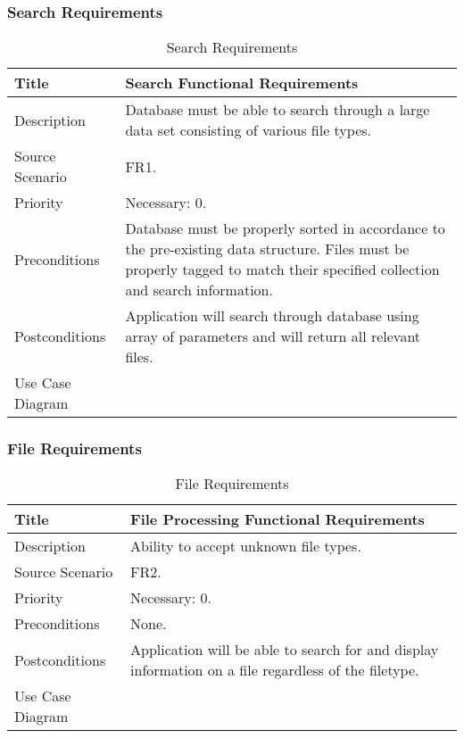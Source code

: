 \subsubsection{Search Requirements}
  \begin{table}[h!]
    \caption{Search Requirements}
    \label{system-requirements/functional-requirements/search}
    \begin{tabularx}{\textwidth}{|l|X|}
      \hline
      Title            & Search Functional Requirements \\ \hline
      Description      & Database must be able to search through a large data
                         set consisting of various file types. \\ \hline
      Source Scenario  & FR1. \\ \hline
      Priority         & Necessary: 0. \\ \hline
      Preconditions    & Database must be properly sorted in accordance to the
                         pre-existing data structure. Files must be properly
                         tagged to match their specified collection and search
                         information. \\ \hline
      Postconditions   & Application will search through database using array of
                         parameters and will return all relevant files. \\
                         \hline
      Use Case Diagram & \\ \hline
    \end{tabularx}
  \end{table}

\subsubsection{File Requirements}
  \begin{table}[h!]
    \caption{File Requirements}
    \label{system-requirements/functional-requirements/file}
    \begin{tabularx}{\textwidth}{|l|X|}
      \hline
      Title            & File Processing Functional Requirements \\ \hline
      Description      & Ability to accept unknown file types. \\ \hline
      Source Scenario  & FR2. \\ \hline
      Priority         & Necessary: 0. \\ \hline
      Preconditions    & None. \\ \hline
      Postconditions   & Application will be able to search for and display
                         information on a file regardless of the filetype. \\
                         \hline
      Use Case Diagram & \\ \hline
    \end{tabularx}
  \end{table}

